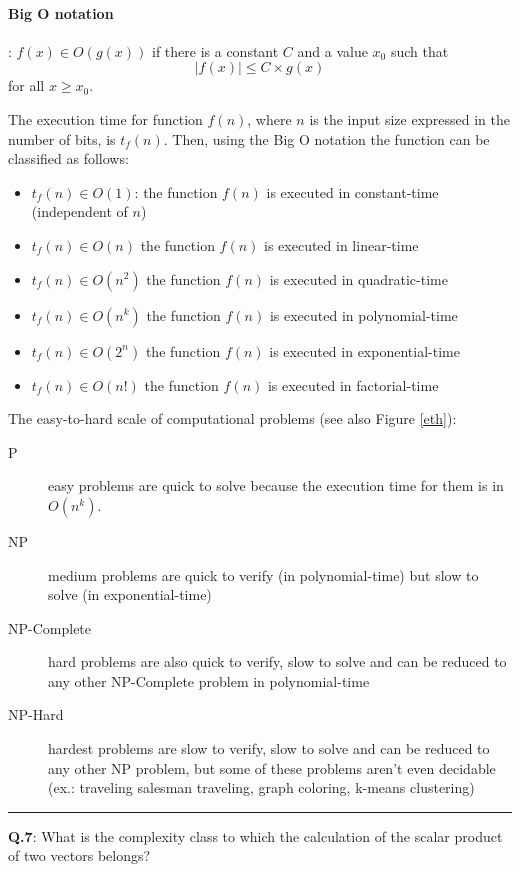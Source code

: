 \paragraph{Big O notation}: $f(x) \in O(g(x))$ if there is a constant $C$ and a value $x_0$ such that $$|f(x)| \leq C \times g(x)$$ for all $x \geq x_{0}$.

The execution time for function $f(n)$, where $n$ is the input size expressed in the number of bits, is $t_f(n)$. Then, using the Big O notation the function can be classified as follows:
\begin{itemize}
    \item $t_f(n) \in O(1)$: the function $f(n)$ is executed in constant-time (independent of $n$)
    \item $t_f(n) \in O(n)$ the function $f(n)$ is executed in linear-time
    \item $t_f(n) \in O(n^2)$ the function $f(n)$ is executed in quadratic-time
    \item $t_f(n) \in O(n^k)$ the function $f(n)$ is executed in polynomial-time
    \item $t_f(n) \in O(2^n)$ the function $f(n)$ is executed in exponential-time
    \item $t_f(n) \in O(n!)$ the function $f(n)$ is executed in factorial-time
\end{itemize}

The easy-to-hard scale of computational problems (see also Figure \ref{eth}):
\begin{description}
\item[P] easy problems are quick to solve because the execution time for them is in $O(n^k)$.
\item[NP] medium problems are quick to verify (in polynomial-time) but slow to solve (in exponential-time)
\item[NP-Complete] hard problems are also quick to verify, slow to solve and can be reduced to any other NP-Complete problem in polynomial-time
\item[NP-Hard] hardest problems are slow to verify, slow to solve and can be reduced to any other NP problem, but some of these problems aren't even decidable (ex.: traveling salesman traveling, graph coloring, k-means clustering)
\end{description}

\noindent\rule{16cm}{0.8pt}

{\bf Q.7}: What is the complexity class to which the calculation of the scalar product of two vectors belongs?

